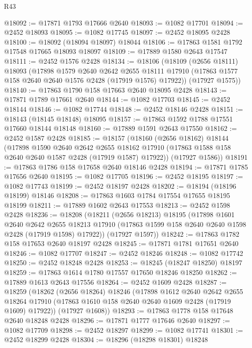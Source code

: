 \begin{lexlean}{R43}
\begin{coremodule}
@18092 := @17871 @1793 @17666 @2640
@18093 := @1082 @17701
@18094 := @2452 @18093
@18095 := @1082 @17745
@18097 := @2452 @18095 @2428
@18100 := @18092 (@18094 @18097) @18044
@18106 := @17863 @1581 @1792 @17548 @17665 @18093 @18097
@18109 := @17889 @1580 @2643 @17547
@18111 := @2452 @1576 @2428
@18134 := @18106
    (@18109
      (@2656 @18111)
      @18093
      (@17898
        @1579
        @2640
        @2642
        @2655
        @18111
        @17910
        (@17863 @1577 @158 @2640 @2640 @1576 @2428 (@17919 @1576) @17922))
      (@17927 @1575))
@18140 := @17863 @1790 @158 @17663 @2640 @18095 @2428
@18143 := @17871 @1789 @17661 @2640
@18144 := @1082 @17703
@18145 := @2452 @18144
@18146 := @1082 @17744
@18148 := @2452 @18146 @2428
@18151 := @18143 (@18145 @18148) @18095
@18157 := @17863 @1592 @1788 @17551 @17660 @18144 @18148
@18160 := @17889 @1591 @2643 @17550
@18162 := @2452 @1587 @2428
@18185 := @18157
    (@18160
      (@2656 @18162)
      @18144
      (@17898
        @1590
        @2640
        @2642
        @2655
        @18162
        @17910
        (@17863 @1588 @158 @2640 @2640 @1587 @2428 (@17919 @1587) @17922))
      (@17927 @1586))
@18191 := @17863 @1786 @158 @17658 @2640 @18146 @2428
@18194 := @17871 @1785 @17656 @2640
@18195 := @1082 @17705
@18196 := @2452 @18195
@18197 := @1082 @17743
@18199 := @2452 @18197 @2428
@18202 := @18194 (@18196 @18199) @18146
@18208 := @17863 @1603 @1784 @17554 @17655 @18195 @18199
@18211 := @17889 @1602 @2643 @17553
@18213 := @2452 @1598 @2428
@18236 := @18208
    (@18211
      (@2656 @18213)
      @18195
      (@17898
        @1601
        @2640
        @2642
        @2655
        @18213
        @17910
        (@17863 @1599 @158 @2640 @2640 @1598 @2428 (@17919 @1598) @17922))
      (@17927 @1597))
@18242 := @17863 @1782 @158 @17653 @2640 @18197 @2428
@18245 := @17871 @1781 @17651 @2640
@18246 := @1082 @17707
@18247 := @2452 @18246
@18248 := @1082 @17742
@18250 := @2452 @18248 @2428
@18253 := @18245 (@18247 @18250) @18197
@18259 := @17863 @1614 @1780 @17557 @17650 @18246 @18250
@18262 := @17889 @1613 @2643 @17556
@18264 := @2452 @1609 @2428
@18287 := @18259
    (@18262
      (@2656 @18264)
      @18246
      (@17898
        @1612
        @2640
        @2642
        @2655
        @18264
        @17910
        (@17863 @1610 @158 @2640 @2640 @1609 @2428 (@17919 @1609) @17922))
      (@17927 @1608))
@18293 := @17863 @1778 @158 @17648 @2640 @18248 @2428
@18296 := @17871 @1777 @17646 @2640
@18297 := @1082 @17709
@18298 := @2452 @18297
@18299 := @1082 @17741
@18301 := @2452 @18299 @2428
@18304 := @18296 (@18298 @18301) @18248

\end{coremodule}
\end{lexlean}
